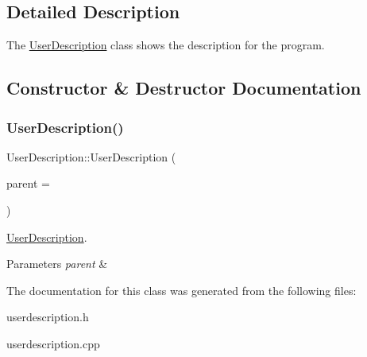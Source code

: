 \subsection{Detailed Description}
The \hyperlink{class_user_description}{User\+Description} class shows the description for the program. 

\subsection{Constructor \& Destructor Documentation}
\mbox{\label{class_user_description_a07117ea9e660fd6ae0a7ecc569edf0f6}} 
\subsubsection{\texorpdfstring{User\+Description()}{UserDescription()}}
{\footnotesize\ttfamily User\+Description\+::\+User\+Description (\begin{DoxyParamCaption}\item[{Q\+Widget $\ast$}]{parent = {} }\end{DoxyParamCaption})\hspace{0.3cm}{\ttfamily [explicit]}}



\hyperlink{class_user_description}{User\+Description}. 


\begin{DoxyParams}{Parameters}
{\em parent} & \\
\hline
\end{DoxyParams}


The documentation for this class was generated from the following files\+:\begin{DoxyCompactItemize}
\item 
userdescription.\+h\item 
userdescription.\+cpp\end{DoxyCompactItemize}

